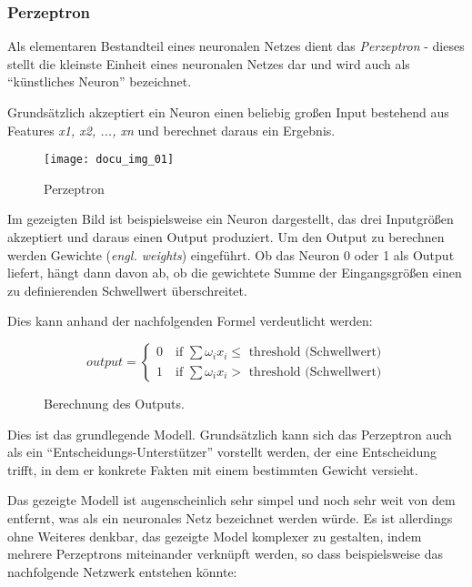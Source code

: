 \subsubsection{Perzeptron}

Als elementaren Bestandteil eines neuronalen Netzes dient das \textit{Perzeptron} - dieses stellt die kleinste Einheit eines neuronalen Netzes dar und wird auch als ``künstliches Neuron'' bezeichnet.

Grundsätzlich akzeptiert ein Neuron einen beliebig großen Input bestehend aus Features \textit{x1, x2, ..., xn} und berechnet daraus ein Ergebnis.

\begin{figure}[H]
    \centering
    \texttt{[image: docu\_img\_01]}
    \caption{Perzeptron}
    \label{fig:perzeptron}
\end{figure}

Im gezeigten Bild ist beispielsweise ein Neuron dargestellt, das drei Inputgrößen akzeptiert und daraus einen Output produziert. Um den Output zu berechnen werden Gewichte (\textit{engl. weights}) eingeführt. Ob das Neuron 0 oder 1 als Output liefert, hängt dann davon ab, ob die gewichtete Summe der Eingangsgrößen einen zu definierenden Schwellwert überschreitet.

Dies kann anhand der nachfolgenden Formel verdeutlicht werden:

\begin{figure}[H]
    \centering
    \[ output =
      \begin{cases}
        0 \quad \text{if } \sum \omega_i x_i \leqslant \text{ threshold (Schwellwert)}\\
        1 \quad \text{if } \sum \omega_i x_i > \text{ threshold (Schwellwert)}
      \end{cases}
    \]
    \caption{Berechnung des Outputs.}
    \label{fig:neuron-three-way}
\end{figure}

Dies ist das grundlegende Modell. Grundsätzlich kann sich das Perzeptron auch als ein ``Entscheidungs-Unterstützer'' vorstellt werden, der eine Entscheidung trifft, in dem er konkrete Fakten mit einem bestimmten Gewicht versieht.

Das gezeigte Modell ist augenscheinlich sehr simpel und noch sehr weit von dem entfernt, was als ein neuronales Netz bezeichnet werden würde. Es ist allerdings ohne Weiteres denkbar, das gezeigte Model komplexer zu gestalten, indem mehrere Perzeptrons miteinander verknüpft werden, so dass beispielsweise das nachfolgende Netzwerk entstehen könnte:


